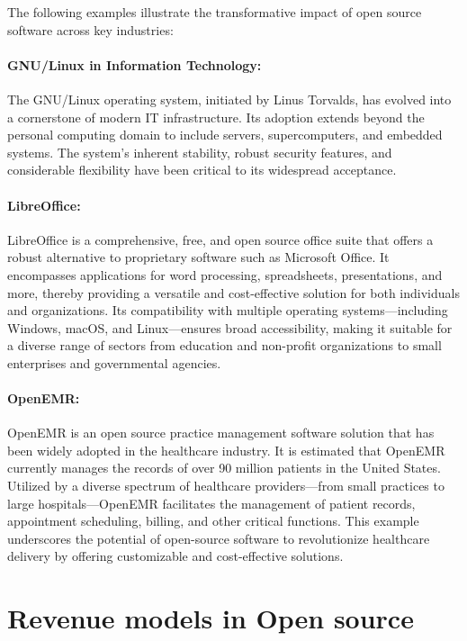 The following examples illustrate the transformative impact of open source software across key industries:

\paragraph{GNU/Linux in Information Technology:}  
The GNU/Linux operating system, initiated by Linus Torvalds, has evolved into a cornerstone of modern IT infrastructure. Its adoption extends beyond the personal computing domain to include servers, supercomputers, and embedded systems. The system’s inherent stability, robust security features, and considerable flexibility have been critical to its widespread acceptance.
\cite{Open-source-Success-Stories}

\paragraph{LibreOffice:}  
LibreOffice is a comprehensive, free, and open source office suite that offers a robust alternative to proprietary software such as Microsoft Office. It encompasses applications for word processing, spreadsheets, presentations, and more, thereby providing a versatile and cost-effective solution for both individuals and organizations. Its compatibility with multiple operating systems—including Windows, macOS, and Linux—ensures broad accessibility, making it suitable for a diverse range of sectors from education and non-profit organizations to small enterprises and governmental agencies.
\cite{LibreOffice-Website}

\paragraph{OpenEMR:}  
OpenEMR is an open source practice management software solution that has been widely adopted in the healthcare industry. It is estimated that OpenEMR currently manages the records of over 90 million patients in the United States. Utilized by a diverse spectrum of healthcare providers—from small practices to large hospitals—OpenEMR facilitates the management of patient records, appointment scheduling, billing, and other critical functions. This example underscores the potential of open-source software to revolutionize healthcare delivery by offering customizable and cost-effective solutions.
\cite{emr-open-sour}


\section{Revenue models in Open source}

